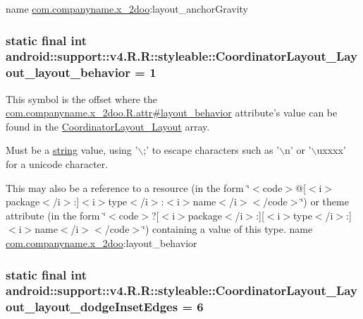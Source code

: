name \hyperlink{namespacecom_1_1companyname_1_1x__2doo}{com.companyname.x\_\-2doo}:layout\_\-anchorGravity \hypertarget{classandroid_1_1support_1_1v4_1_1_r_1_1styleable_982d12aa414414e1e0475e69c9587a1c}{
\subsubsection[{CoordinatorLayout\_\-Layout\_\-layout\_\-behavior}]{\setlength{\rightskip}{0pt plus 5cm}static final int android::support::v4.R.R::styleable::CoordinatorLayout\_\-Layout\_\-layout\_\-behavior = 1}}
\label{classandroid_1_1support_1_1v4_1_1_r_1_1styleable_982d12aa414414e1e0475e69c9587a1c}


This symbol is the offset where the \hyperlink{classcom_1_1companyname_1_1x__2doo_1_1_r_1_1attr_97e21f24c9d00877e459e35733cf4c20}{com.companyname.x\_\-2doo.R.attr\#layout\_\-behavior} attribute's value can be found in the \hyperlink{classandroid_1_1support_1_1v4_1_1_r_1_1styleable_002d98b0482bfb71440db629b16e17bf}{CoordinatorLayout\_\-Layout} array.

Must be a \hyperlink{classandroid_1_1support_1_1v4_1_1_r_1_1string}{string} value, using '$\backslash$;' to escape characters such as '$\backslash$n' or '$\backslash$uxxxx' for a unicode character. 

This may also be a reference to a resource (in the form \char`\"{}$<$code$>$@\mbox{[}$<$i$>$package$<$/i$>$:\mbox{]}$<$i$>$type$<$/i$>$:$<$i$>$name$<$/i$>$$<$/code$>$\char`\"{}) or theme attribute (in the form \char`\"{}$<$code$>$?\mbox{[}$<$i$>$package$<$/i$>$:\mbox{]}\mbox{[}$<$i$>$type$<$/i$>$:\mbox{]}$<$i$>$name$<$/i$>$$<$/code$>$\char`\"{}) containing a value of this type.  name \hyperlink{namespacecom_1_1companyname_1_1x__2doo}{com.companyname.x\_\-2doo}:layout\_\-behavior \hypertarget{classandroid_1_1support_1_1v4_1_1_r_1_1styleable_a57573ce33cb7197819b20094f59046d}{
\subsubsection[{CoordinatorLayout\_\-Layout\_\-layout\_\-dodgeInsetEdges}]{\setlength{\rightskip}{0pt plus 5cm}static final int android::support::v4.R.R::styleable::CoordinatorLayout\_\-Layout\_\-layout\_\-dodgeInsetEdges = 6}}
\label{classandroid_1_1support_1_1v4_1_1_r_1_1styleable_a57573ce33cb7197819b20094f59046d}


